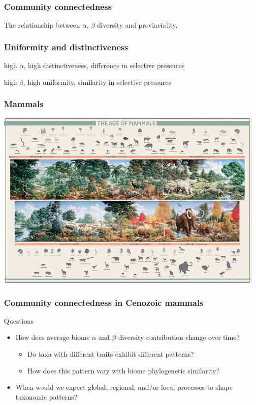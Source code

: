 \documentclass{beamer}
\begin{document}
\begin{frame}
  \frametitle{Community connectedness}
  \begin{definition}
    The relationship between \(\alpha\), \(\beta\) diversity and provinciality.
  \end{definition}
\end{frame}

\begin{frame}
  \frametitle{Uniformity and distinctiveness}
  
  high \(\alpha\), high distinctiveness, difference in selective pressures
  
  \vspace{1cm}

  high \(\beta\), high uniformity, similarity in selective pressures

\end{frame}

\begin{frame}
  \frametitle{Mammals}
  \includegraphics[height = 0.9\textheight, width = \textwidth, keepaspectratio = true]{figure/aom}

  \tiny{}
\end{frame}

\begin{frame}
  \frametitle{Community connectedness in Cenozoic mammals}

  \begin{block}{Questions}
    \begin{itemize}
      \item How does average biome \(\alpha\) and \(\beta\) diversity contribution change over time?
        \begin{itemize}
          \item Do taxa with different traits exhibit different patterns?
          \item How does this pattern vary with biome phylogenetic similarity? 
        \end{itemize}
      \item When would we expect global, regional, and/or local processes to shape taxonomic patterns?
    \end{itemize}
  \end{block}
\end{frame}
\end{document}
